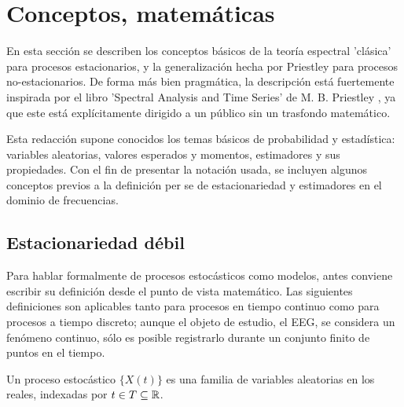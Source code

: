 
\section{Conceptos, matem\'aticas}

En esta secci\'on se describen los conceptos b\'asicos de la teor\'ia espectral 'cl\'asica' para 
procesos estacionarios, y la generalizaci\'on hecha por Priestley para procesos no-estacionarios. 
De forma m\'as bien pragm\'atica, la descripci\'on est\'a
 fuertemente inspirada por el libro 'Spectral Analysis and Time Series' 
de M. B. Priestley \cite{Priestley81}, ya que este est\'a expl\'icitamente dirigido a un p\'ublico 
sin un trasfondo matem\'atico.

Esta redacci\'on supone conocidos los temas b\'asicos de probabilidad y estad\'istica:
variables aleatorias, valores esperados y momentos, estimadores y sus propiedades.
Con el fin de presentar la notaci\'on usada, se incluyen algunos conceptos previos a la 
definici\'on per se de estacionariedad y estimadores en el dominio de frecuencias.


\subsection{Estacionariedad d\'ebil}

Para hablar formalmente de procesos estoc\'asticos como modelos, antes 
conviene escribir su definici\'on desde el punto de vista matem\'atico. Las siguientes definiciones
son aplicables tanto para procesos en tiempo continuo
como para procesos a tiempo discreto; aunque el objeto de estudio, el EEG, se considera 
un fen\'omeno continuo, s\'olo es posible registrarlo durante un conjunto finito de puntos 
en el tiempo.

\begin{defn}
Un proceso estoc\'astico $\{ X(t) \}$ es una familia de variables aleatorias 
en los reales,
indexadas por
$t \in T \subseteq \mathbb{R}$.
\end{defn}

